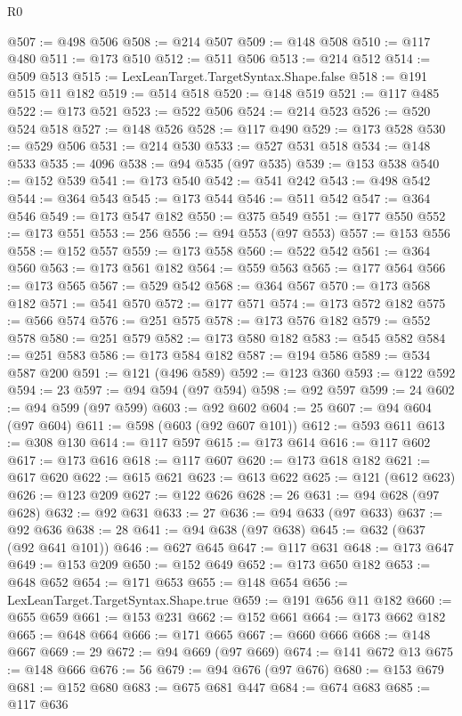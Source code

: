 \begin{lexlean}{R0}
\begin{coremodule}
@507 := @498 @506
@508 := @214 @507
@509 := @148 @508
@510 := @117 @480
@511 := @173 @510
@512 := @511 @506
@513 := @214 @512
@514 := @509 @513
@515 := LexLeanTarget.TargetSyntax.Shape.false
@518 := @191 @515 @11 @182
@519 := @514 @518
@520 := @148 @519
@521 := @117 @485
@522 := @173 @521
@523 := @522 @506
@524 := @214 @523
@526 := @520 @524 @518
@527 := @148 @526
@528 := @117 @490
@529 := @173 @528
@530 := @529 @506
@531 := @214 @530
@533 := @527 @531 @518
@534 := @148 @533
@535 := 4096
@538 := @94 @535 (@97 @535)
@539 := @153 @538
@540 := @152 @539
@541 := @173 @540
@542 := @541 @242
@543 := @498 @542
@544 := @364 @543
@545 := @173 @544
@546 := @511 @542
@547 := @364 @546
@549 := @173 @547 @182
@550 := @375 @549
@551 := @177 @550
@552 := @173 @551
@553 := 256
@556 := @94 @553 (@97 @553)
@557 := @153 @556
@558 := @152 @557
@559 := @173 @558
@560 := @522 @542
@561 := @364 @560
@563 := @173 @561 @182
@564 := @559 @563
@565 := @177 @564
@566 := @173 @565
@567 := @529 @542
@568 := @364 @567
@570 := @173 @568 @182
@571 := @541 @570
@572 := @177 @571
@574 := @173 @572 @182
@575 := @566 @574
@576 := @251 @575
@578 := @173 @576 @182
@579 := @552 @578
@580 := @251 @579
@582 := @173 @580 @182
@583 := @545 @582
@584 := @251 @583
@586 := @173 @584 @182
@587 := @194 @586
@589 := @534 @587 @200
@591 := @121 (@496 @589)
@592 := @123 @360
@593 := @122 @592
@594 := 23
@597 := @94 @594 (@97 @594)
@598 := @92 @597
@599 := 24
@602 := @94 @599 (@97 @599)
@603 := @92 @602
@604 := 25
@607 := @94 @604 (@97 @604)
@611 := @598 (@603 (@92 @607 @101))
@612 := @593 @611
@613 := @308 @130
@614 := @117 @597
@615 := @173 @614
@616 := @117 @602
@617 := @173 @616
@618 := @117 @607
@620 := @173 @618 @182
@621 := @617 @620
@622 := @615 @621
@623 := @613 @622
@625 := @121 (@612 @623)
@626 := @123 @209
@627 := @122 @626
@628 := 26
@631 := @94 @628 (@97 @628)
@632 := @92 @631
@633 := 27
@636 := @94 @633 (@97 @633)
@637 := @92 @636
@638 := 28
@641 := @94 @638 (@97 @638)
@645 := @632 (@637 (@92 @641 @101))
@646 := @627 @645
@647 := @117 @631
@648 := @173 @647
@649 := @153 @209
@650 := @152 @649
@652 := @173 @650 @182
@653 := @648 @652
@654 := @171 @653
@655 := @148 @654
@656 := LexLeanTarget.TargetSyntax.Shape.true
@659 := @191 @656 @11 @182
@660 := @655 @659
@661 := @153 @231
@662 := @152 @661
@664 := @173 @662 @182
@665 := @648 @664
@666 := @171 @665
@667 := @660 @666
@668 := @148 @667
@669 := 29
@672 := @94 @669 (@97 @669)
@674 := @141 @672 @13
@675 := @148 @666
@676 := 56
@679 := @94 @676 (@97 @676)
@680 := @153 @679
@681 := @152 @680
@683 := @675 @681 @447
@684 := @674 @683
@685 := @117 @636

\end{coremodule}
\end{lexlean}
